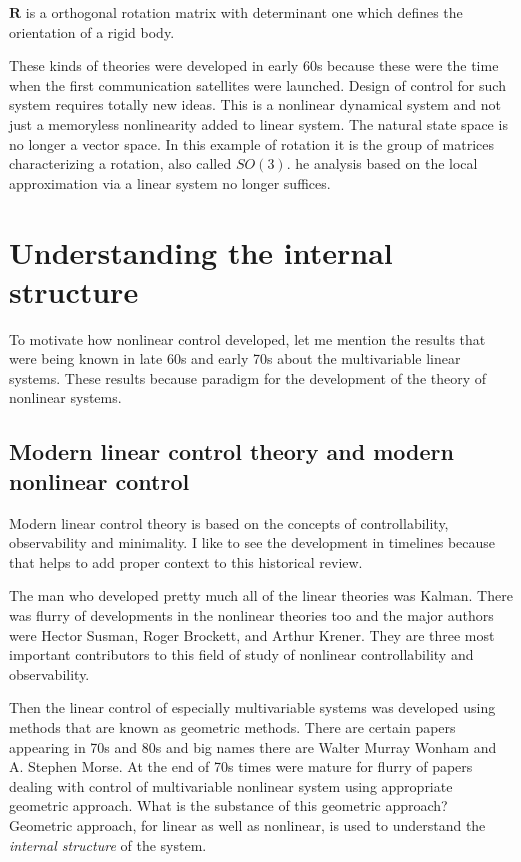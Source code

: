 \documentclass{article}
\begin{document}
$\bm{R}$ is a orthogonal rotation matrix with determinant one which defines the orientation of a rigid body.

These kinds of theories were developed in early 60s because these were the time when the first communication satellites were launched. Design of control for such system requires totally new ideas. This is a nonlinear dynamical system and not just a memoryless nonlinearity added to linear system. The natural state space is no longer a vector space. In this example of rotation it is the group of matrices characterizing a rotation, also called $SO(3)$. he analysis based on the local approximation via a linear system no longer suffices.

\section{Understanding the internal structure}
To motivate how nonlinear control developed, let me mention the results that were being known in late 60s and early 70s about the multivariable linear systems. These results because paradigm for the development of the theory of nonlinear systems.

\subsection*{Modern linear control theory and modern nonlinear control}
Modern linear control theory is based on the concepts of controllability, observability and minimality. I like to see the development in timelines because that helps to add proper context to this historical review.

The man who developed pretty much all of the linear theories was Kalman. There was flurry of developments in the nonlinear theories too and the major authors were Hector Susman, Roger Brockett, and Arthur Krener. They are three most important contributors to this field of study of nonlinear controllability and observability. 

Then the linear control of especially multivariable systems was developed using methods that are known as geometric methods. There are certain papers appearing in 70s and 80s and big names there are Walter Murray Wonham and A. Stephen Morse. At the end of 70s times were mature for flurry of papers dealing with control of multivariable nonlinear system using appropriate geometric approach. What is the substance of this geometric approach? Geometric approach, for linear as well as nonlinear, is used to understand the \textit{internal structure} of the system.
\end{document}
